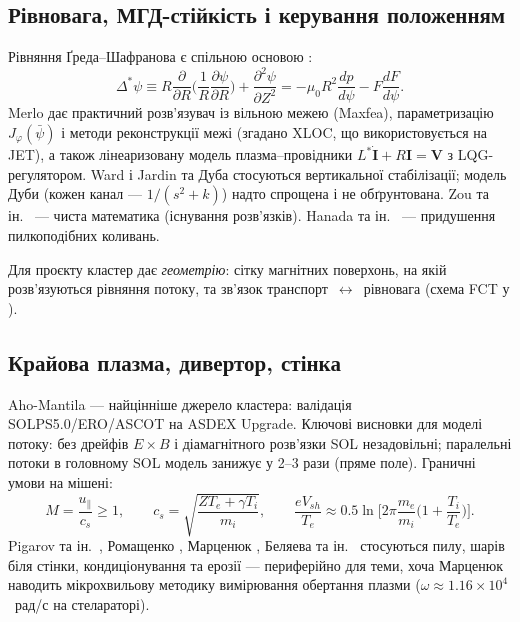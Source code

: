 \documentclass[11pt,a4paper]{article}
\begin{document}
\subsection{Рівновага, МГД-стійкість і керування положенням}

Рівняння Ґреда--Шафранова є спільною основою \cite{Merlo2011,Zou2013,Jardin2000,Fable2022}:
\begin{equation}\label{eq:GS}
  \Delta^*\psi\equiv R\frac{\partial}{\partial R}\Big(\frac1R\frac{\partial\psi}{\partial R}\Big)
  +\frac{\partial^2\psi}{\partial Z^2}=-\mu_0R^2\frac{dp}{d\psi}-F\frac{dF}{d\psi}.
\end{equation}
Merlo \cite{Merlo2011} дає практичний розв'язувач із вільною межею (Maxfea),
параметризацію $J_\varphi(\bar\psi)$ і методи реконструкції межі (згадано XLOC, що
використовується на JET), а також лінеаризовану модель плазма--провідники
$L^*\dot{\mathbf I}+R\mathbf I=\mathbf V$ з LQG-регулятором. Ward і Jardin
\cite{Ward1992} та Дуба \cite{Duba2018} стосуються вертикальної стабілізації;
модель Дуби (кожен канал --- $1/(s^2+k)$) надто спрощена і не обґрунтована.
Zou та ін.\ \cite{Zou2013} --- чиста математика (існування розв'язків).
Hanada та ін.\ \cite{Hanada1990} --- придушення пилкоподібних коливань.

Для проєкту кластер дає \emph{геометрію}: сітку магнітних поверхонь, на якій
розв'язуються рівняння потоку, та зв'язок транспорт~$\leftrightarrow$~рівновага
(схема FCT у \cite{Seto2014}).

\subsection{Крайова плазма, дивертор, стінка}

Aho-Mantila \cite{AhoMantila2011} --- найцінніше джерело кластера: валідація
SOLPS5.0/ERO/ASCOT на ASDEX Upgrade. Ключові висновки для моделі потоку:
без дрейфів $E\times B$ і діамагнітного розв'язки SOL незадовільні; паралельні потоки
в головному SOL модель занижує у 2--3 рази (пряме поле). Граничні умови
на мішені:
\begin{equation}\label{eq:Bohm}
  M=\frac{u_\parallel}{c_s}\ge1,\qquad c_s=\sqrt{\frac{ZT_e+\gamma T_i}{m_i}},\qquad
  \frac{eV_{sh}}{T_e}\approx0.5\ln\Big[2\pi\frac{m_e}{m_i}\Big(1+\frac{T_i}{T_e}\Big)\Big].
\end{equation}
Pigarov та ін.\ \cite{Pigarov2006}, Ромащенко \cite{Romashchenko2021},
Марценюк \cite{Martsenyuk2025}, Беляева та ін.\ \cite{Belyaeva2016} стосуються пилу,
шарів біля стінки, кондиціонування та ерозії --- периферійно для теми, хоча
Марценюк наводить мікрохвильову методику вимірювання обертання плазми
($\omega\approx1.16\times10^4$~рад/с на стелараторі).
\end{document}
